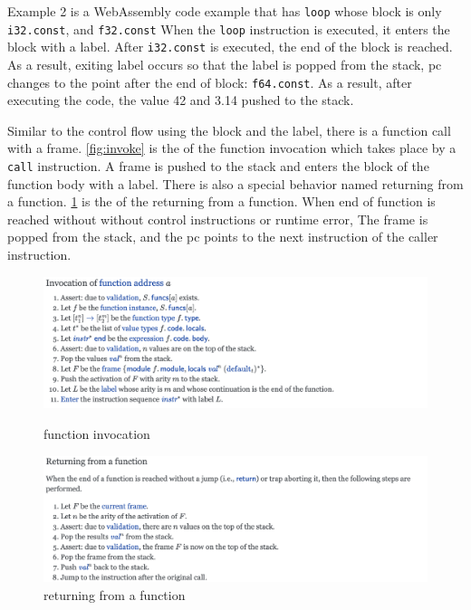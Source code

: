 Example 2 is a WebAssembly code example that has \texttt{loop} whose block is
only \texttt{i32.const}, and \texttt{f32.const}
When the \texttt{loop} instruction is executed, it enters the block with a label.
After \texttt{i32.const} is executed, the end of the block is reached.
As a result, exiting label occurs so that the label is popped from the stack,
pc changes to the point after the end of block: \texttt{f64.const}.
As a result, after executing the code, the value 42 and 3.14 pushed to the
stack.


Similar to the control flow using the block and the label, there is a function
call with a frame.
\cref{fig:invoke} is the \officialp{} of the function invocation which takes
place by a \texttt{call} instruction.
A frame is pushed to the stack and enters the block of the function body with a
label.
There is also a special behavior named returning from a function.
\cref{fig:returning} is the \officialp{} of the returning from a function.
When end of function is reached without without control instructions or runtime
error, The frame is popped from the stack, and the pc points to the next
instruction of the caller instruction.

\begin{figure}[h!]
    \centerline{\includegraphics[width=15cm]{fig/invoke}}
    \caption[Enter the caption title here]{function invocation} \label{fig:invoke}
    \centerline{\includegraphics[width=15cm]{fig/returning}}
    \caption[Enter the caption title here]{returning from a function} \label{fig:returning}
\end{figure}

